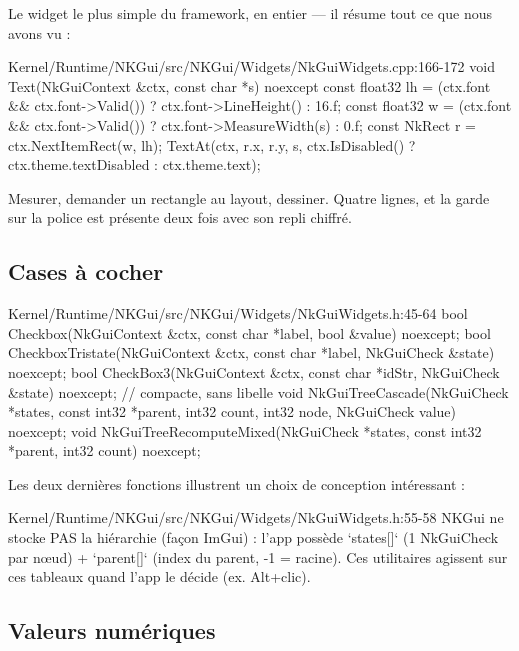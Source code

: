 Le widget le plus simple du framework, en entier — il résume tout ce que nous
avons vu :

\begin{nkcode}{Kernel/Runtime/NKGui/src/NKGui/Widgets/NkGuiWidgets.cpp:166-172}
void Text(NkGuiContext &ctx, const char *s) noexcept {
    const float32 lh = (ctx.font && ctx.font->Valid()) ? ctx.font->LineHeight() : 16.f;
    const float32 w  = (ctx.font && ctx.font->Valid()) ? ctx.font->MeasureWidth(s) : 0.f;
    const NkRect r = ctx.NextItemRect(w, lh);
    TextAt(ctx, {r.x, r.y}, s, ctx.IsDisabled() ? ctx.theme.textDisabled : ctx.theme.text);
}
\end{nkcode}

Mesurer, demander un rectangle au layout, dessiner. Quatre lignes, et la garde
sur la police est présente deux fois avec son repli chiffré.

\subsection{Cases à cocher}

\begin{nkcode}{Kernel/Runtime/NKGui/src/NKGui/Widgets/NkGuiWidgets.h:45-64}
bool Checkbox(NkGuiContext &ctx, const char *label, bool &value) noexcept;
bool CheckboxTristate(NkGuiContext &ctx, const char *label, NkGuiCheck &state) noexcept;
bool CheckBox3(NkGuiContext &ctx, const char *idStr, NkGuiCheck &state) noexcept;   // compacte, sans libelle
void NkGuiTreeCascade(NkGuiCheck *states, const int32 *parent, int32 count, int32 node,
                      NkGuiCheck value) noexcept;
void NkGuiTreeRecomputeMixed(NkGuiCheck *states, const int32 *parent, int32 count) noexcept;
\end{nkcode}

Les deux dernières fonctions illustrent un choix de conception intéressant :

\begin{nkcode}{Kernel/Runtime/NKGui/src/NKGui/Widgets/NkGuiWidgets.h:55-58}
NKGui ne stocke PAS la hiérarchie (façon ImGui) : l'app possède `states[]`
(1 NkGuiCheck par nœud) + `parent[]` (index du parent, -1 = racine). Ces
utilitaires agissent sur ces tableaux quand l'app le décide (ex. Alt+clic).
\end{nkcode}

\subsection{Valeurs numériques}

